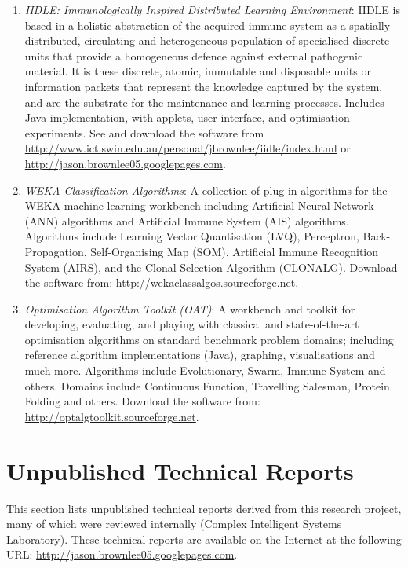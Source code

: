 \begin{enumerate}
	\item \emph{IIDLE: Immunologically Inspired Distributed Learning Environment}: IIDLE is based in a holistic abstraction of the acquired immune system as a spatially distributed, circulating and heterogeneous population of specialised discrete units that provide a homogeneous defence against external pathogenic material. It is these discrete, atomic, immutable and disposable units or information packets that represent the knowledge captured by the system, and are the substrate for the maintenance and learning processes. Includes Java implementation, with applets, user interface, and optimisation experiments. See \cite{Brownlee2006} and download the software from \url{http://www.ict.swin.edu.au/personal/jbrownlee/iidle/index.html} or \url{http://jason.brownlee05.googlepages.com}.	
	\item \emph{WEKA Classification Algorithms}: A collection of plug-in algorithms for the WEKA machine learning workbench including Artificial Neural Network (ANN) algorithms and Artificial Immune System (AIS) algorithms. Algorithms include Learning Vector Quantisation (LVQ), Perceptron, Back-Propagation, Self-Organising Map (SOM), Artificial Immune Recognition System (AIRS), and the Clonal Selection Algorithm (CLONALG). Download the software from: \url{http://wekaclassalgos.sourceforge.net}.
	\item \emph{Optimisation Algorithm Toolkit (OAT)}: A workbench and toolkit for developing, evaluating, and playing with classical and state-of-the-art optimisation algorithms on standard benchmark problem domains; including reference algorithm implementations (Java), graphing, visualisations and much more. Algorithms include Evolutionary, Swarm, Immune System and others. Domains include Continuous Function, Travelling Salesman, Protein Folding and others. Download the software from: \url{http://optalgtoolkit.sourceforge.net}.
\end{enumerate}


\section{Unpublished Technical Reports}
This section lists unpublished technical reports derived from this research project, many of which were reviewed internally (Complex Intelligent Systems Laboratory). These technical reports are available on the Internet at the following URL: \url{http://jason.brownlee05.googlepages.com}. 

